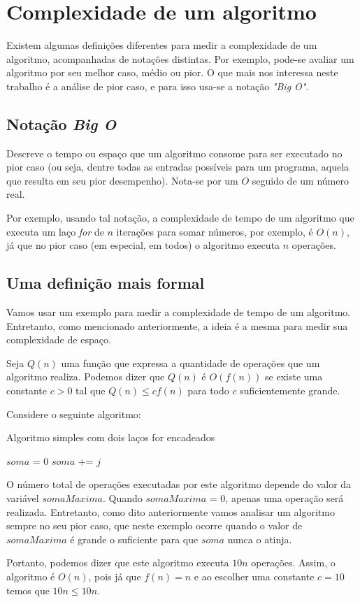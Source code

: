 \section{Complexidade de um algoritmo}

Existem algumas definições diferentes para medir a complexidade de um 
algoritmo, acompanhadas de notações distintas. Por exemplo, pode-se avaliar um 
algoritmo por seu melhor caso, médio ou pior. O que mais nos interessa neste 
trabalho é a análise de pior caso, e para isso usa-se a notação \emph{"Big O"}.

\subsection{Notação \emph{Big O}}
Descreve o tempo ou espaço que um algoritmo consome para ser executado no 
pior caso (ou seja, dentre todas as entradas possíveis para um programa, aquela 
que resulta em seu pior desempenho). Nota-se por um $O$ seguido de um número real. 

Por exemplo, usando tal notação, a complexidade de tempo de um algoritmo que 
executa um laço \emph{for} de $n$ iterações para somar números, por exemplo, é 
$O(n)$, já que no pior caso (em especial, em todos) o algoritmo executa $n$ 
operações.

\subsection{Uma definição mais formal}
Vamos usar um exemplo para medir a complexidade de tempo de um algoritmo. 
Entretanto, como mencionado anteriormente, a ideia é a mesma para medir sua 
complexidade de espaço.

Seja $Q(n)$ uma função que expressa a quantidade de operações que um algoritmo 
realiza. Podemos dizer que $Q(n)$ é $O(f(n))$ se existe uma constante $c > 0$ 
tal que $Q(n) \leq c f(n)$ para todo $c$ suficientemente grande.

\hspace{1cm}

Considere o seguinte algoritmo:

\begin{algorithm}
\caption{Algoritmo simples com dois laços for encadeados}\label{euclid}
\begin{algorithmic}[1]

\State $soma$ = 0
        \State $soma$ += $j$
        \State \Return
        \EndIf
    \EndFor
\EndFor
\end{algorithmic}
\end{algorithm}

O número total de operações executadas por este algoritmo depende do valor 
da variável $somaMaxima$. Quando $somaMaxima$ = 0, apenas uma operação será 
realizada. Entretanto, como dito anteriormente vamos analisar um algoritmo 
sempre no seu pior caso, que neste exemplo ocorre quando o valor de $somaMaxima$
é grande o suficiente para que $soma$ nunca o atinja.

Portanto, podemos dizer que este algoritmo executa $10n$ operações. Assim, o 
algoritmo é $O(n)$, pois já que $f(n) = n$ e ao escolher uma constante $c = 10$ 
temos que $10n \leq 10n$.
